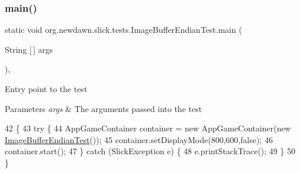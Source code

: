 \mbox{\label{classorg_1_1newdawn_1_1slick_1_1tests_1_1_image_buffer_endian_test_a1e6438bfe366a8fac4f6fc92b64d2ad4}} 
\subsubsection{\texorpdfstring{main()}{main()}}
{\footnotesize\ttfamily static void org.\+newdawn.\+slick.\+tests.\+Image\+Buffer\+Endian\+Test.\+main (\begin{DoxyParamCaption}\item[{String \mbox{[}$\,$\mbox{]}}]{args }\end{DoxyParamCaption})\hspace{0.3cm}{\ttfamily [inline]}, {\ttfamily [static]}}

Entry point to the test


\begin{DoxyParams}{Parameters}
{\em args} & The arguments passed into the test \\
\hline
\end{DoxyParams}

\begin{DoxyCode}
42                                           \{
43       \textcolor{keywordflow}{try} \{
44          AppGameContainer container = \textcolor{keyword}{new} AppGameContainer(\textcolor{keyword}{new} 
      \mbox{\hyperlink{classorg_1_1newdawn_1_1slick_1_1tests_1_1_image_buffer_endian_test_a22116623ff2ea6f5a788e63d9fa61508}{ImageBufferEndianTest}}());
45          container.setDisplayMode(800,600,\textcolor{keyword}{false});
46          container.start();
47       \} \textcolor{keywordflow}{catch} (SlickException e) \{
48          e.printStackTrace();
49       \}
50    \}
\end{DoxyCode}
\mbox{\label{classorg_1_1newdawn_1_1slick_1_1tests_1_1_image_buffer_endian_test_a6d3562057b0c05a9fd2156691abd7229}} 
